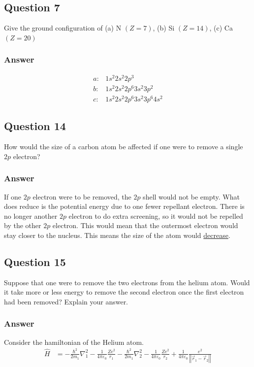 \documentclass[12pt]{article}
\begin{document}
        \subsection{Question 7}
            Give the ground configuration of (a) N $(Z = 7)$, (b) Si $(Z = 14)$, (c) Ca $(Z = 20)$

            \subsubsection{Answer}
                \begin{align}
                    a:& 1s^2 2s^2 2p^3\\
                    b:& 1s^2 2s^2 2p^6 3s^2 3p^2\\
                    c:& 1s^2 2s^2 2p^6 3s^2 3p^6 4s^2
                \end{align}
            
        \subsection{Question 14}
            How would the size of a carbon atom be affected if one were to remove a single $2p$ electron?

            \subsubsection{Answer}
                If one $2p$ electron were to be removed, the $2p$ shell would not be empty. 
                What does reduce is the potential energy due to one fewer repellant electron.
                There is no longer another $2p$ electron to do extra screening, so it would not be repelled by the other $2p$ electron.
                This would mean that the outermost electron would stay closer to the nucleus.
                This means the size of the atom would \underline{decrease}.    
        \pagebreak

        \subsection{Question 15}
            Suppose that one were to remove the two electrons from the helium atom. 
            Would it take more or less energy to remove the second electron once the first electron had been removed? 
            Explain your answer.

            \subsubsection{Answer}
                Consider the hamiltonian of the Helium atom.
                \scriptsize
                \begin{align}
                    \hat{H} &=  -\frac{\hbar^2}{2m_1}\nabla_1^2 - \frac{1}{4\pi\varepsilon_0} \frac{Ze^2}{r_1} - \frac{\hbar^2}{2m_1}\nabla_2^2 - \frac{1}{4\pi\varepsilon_0} \frac{Ze^2}{r_2} + \frac{1}{4\pi\varepsilon_0} \frac{e^2}{\left| \left| \vec{r}_1 - \vec{r}_2 \right| \right|}
                \end{align}
\end{document}
